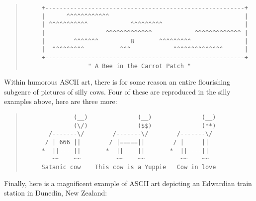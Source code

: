 \begin{figure*}
    \begin{quote}
        \begin{verbatim}
     +--------------------------------------------------------+
     |      ^^^^^^^^^^^^                                      |
     | ^^^^^^^^^^^            ^^^^^^^^^                       |
     |                 ^^^^^^^^^^^^^            ^^^^^^^^^^^^^ |
     |        ^^^^^^^         B       ^^^^^^^^^               |
     |  ^^^^^^^^^          ^^^            ^^^^^^^^^^^^^^      |
     +--------------------------------------------------------+
                  " A Bee in the Carrot Patch "
        \end{verbatim}
    \end{quote}
\end{figure*}

Within humorous ASCII art, there is for some reason an entire flourishing subgenre of pictures of silly cows. Four of these are reproduced
in the silly examples above, here are three more:

\begin{figure*}
    \begin{quote}
        \begin{verbatim}
              (__)              (__)              (__)
              (\/)              ($$)              (**)
       /-------\/        /-------\/        /-------\/
      / | 666 ||        / |=====||        / |     ||
     *  ||----||       *  ||----||       *  ||----||
        ~~    ~~          ~~    ~~          ~~    ~~
     Satanic cow    This cow is a Yuppie   Cow in love
        \end{verbatim}
    \end{quote}
\end{figure*}

Finally, here is a magnificent example of ASCII art depicting an Edwardian train station in Dunedin, New Zealand:

